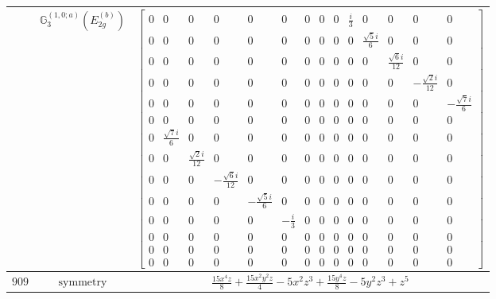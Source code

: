 \documentclass[fleqn,8pt,landscape]{jsarticle}
\begin{document}
\begin{longtable}{ccc}
$  $ & $ \mathbb{G}_{3}^{(1,0;a)}(E_{2g}^{(b)}) $ & $ \begin{bmatrix} 0 & 0 & 0 & 0 & 0 & 0 & 0 & 0 & 0 & \frac{i}{3} & 0 & 0 & 0 & 0 \\ 0 & 0 & 0 & 0 & 0 & 0 & 0 & 0 & 0 & 0 & \frac{\sqrt{5} i}{6} & 0 & 0 & 0 \\ 0 & 0 & 0 & 0 & 0 & 0 & 0 & 0 & 0 & 0 & 0 & \frac{\sqrt{6} i}{12} & 0 & 0 \\ 0 & 0 & 0 & 0 & 0 & 0 & 0 & 0 & 0 & 0 & 0 & 0 & - \frac{\sqrt{2} i}{12} & 0 \\ 0 & 0 & 0 & 0 & 0 & 0 & 0 & 0 & 0 & 0 & 0 & 0 & 0 & - \frac{\sqrt{7} i}{6} \\ 0 & 0 & 0 & 0 & 0 & 0 & 0 & 0 & 0 & 0 & 0 & 0 & 0 & 0 \\ 0 & \frac{\sqrt{7} i}{6} & 0 & 0 & 0 & 0 & 0 & 0 & 0 & 0 & 0 & 0 & 0 & 0 \\ 0 & 0 & \frac{\sqrt{2} i}{12} & 0 & 0 & 0 & 0 & 0 & 0 & 0 & 0 & 0 & 0 & 0 \\ 0 & 0 & 0 & - \frac{\sqrt{6} i}{12} & 0 & 0 & 0 & 0 & 0 & 0 & 0 & 0 & 0 & 0 \\ 0 & 0 & 0 & 0 & - \frac{\sqrt{5} i}{6} & 0 & 0 & 0 & 0 & 0 & 0 & 0 & 0 & 0 \\ 0 & 0 & 0 & 0 & 0 & - \frac{i}{3} & 0 & 0 & 0 & 0 & 0 & 0 & 0 & 0 \\ 0 & 0 & 0 & 0 & 0 & 0 & 0 & 0 & 0 & 0 & 0 & 0 & 0 & 0 \\ 0 & 0 & 0 & 0 & 0 & 0 & 0 & 0 & 0 & 0 & 0 & 0 & 0 & 0 \\ 0 & 0 & 0 & 0 & 0 & 0 & 0 & 0 & 0 & 0 & 0 & 0 & 0 & 0 \end{bmatrix} $ \\ \hline
$ 909 $ & $ \text{symmetry} $ & $ \frac{15 x^{4} z}{8} + \frac{15 x^{2} y^{2} z}{4} - 5 x^{2} z^{3} + \frac{15 y^{4} z}{8} - 5 y^{2} z^{3} + z^{5} $ \\

\end{longtable}
\end{document}
